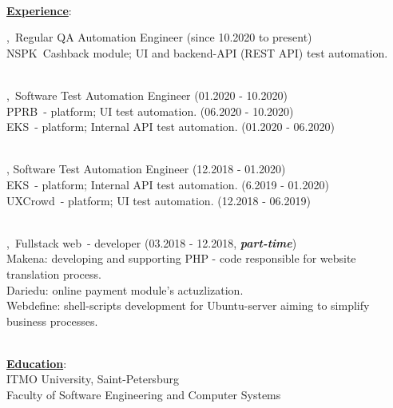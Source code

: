 \documentclass[hidelinks,12pt,a4paper,oneside]{article}
\newcommand*\simpleruleline[1]{\par\noindent\raisebox{.8ex}{\makebox[\linewidth]{\hrulefill\hspace{#1}}}}
\newcommand*\tqs{\textquotesingle}
\begin{document}
\vspace{-15px}
\ \\
{\Large \underline{\textbf{Experience}}}:
\begin{addmargin}[1em]{2em}%
\vspace{11px}
{\large
\tqs \href{https://www.luxoft.com/}{}\tqs,\ Regular QA Automation Engineer {\small(since 10.2020 to present)}} \\
\textcolor{marengo} {
	{\small \tqs NSPK\tqs\ Cashback module;  UI and backend-API (REST API) test automation.}
}
\simpleruleline{6ex} \\
{\large
\tqs \href{https://www.sberbank.ru/}{}\tqs,\ Software Test Automation Engineer {\small(01.2020 - 10.2020)}} \\
\textcolor{marengo} {
	{\small \tqs PPRB\tqs\ - platform; UI test automation.}  {\scriptsize (06.2020 - 10.2020)} \\
	{\small \tqs EKS\tqs\ - platform; Internal API test automation.} {\scriptsize (01.2020 - 06.2020)}
}
\simpleruleline{6ex} \\
{\large
\tqs \href{https://www.performance-lab.ru/}{}\tqs, Software Test Automation Engineer {\small(12.2018 - 01.2020)}} \\
\textcolor{marengo} {
	{\small \tqs EKS\tqs\ - platform; Internal API test automation.} {\scriptsize (6.2019 - 01.2020)} \\
	{\small \tqs UXCrowd\tqs\ - platform; UI test automation.} {\scriptsize (12.2018 - 06.2019)}
}
\simpleruleline{6ex} \\
{\large
\tqs \href{https://webdefine.net/}{}\tqs,\ Fullstack web\ - developer {\small(03.2018 - 12.2018, \emph{\textbf{part-time}})}} \\
\textcolor{marengo} {
	{\small \tqs Makena\tqs: developing and supporting PHP - code responsible for website translation process.} \\
	{\small \tqs Dariedu\tqs: online payment module's actuzlization.} \\
	{\small \tqs Webdefine\tqs:  shell-scripts development for Ubuntu-server aiming to simplify business processes.}
}
\end{addmargin}
\ \\
{\Large \underline{\textbf{Education}}}: \\ [8px]
{\large ITMO University, Saint-Petersburg} \\
Faculty of Software Engineering and Computer Systems
\end{document}

